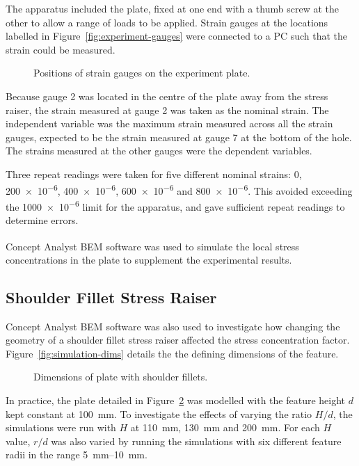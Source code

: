 \documentclass[a4paper,11pt,twocolumn]{article}
\newcommand{\BEM}{\textsc{BEM}\xspace}
\newcommand{\mm}{\si{\milli\meter}\xspace}
\begin{document}
The apparatus included the plate, fixed at one end with a thumb screw at the 
other to allow a range of loads to be applied. Strain gauges at the 
locations labelled in Figure~\vref{fig:experiment-gauges} were connected to a 
\textsc{PC} such that the strain could be measured.

\begin{figure}[h]
    \centering
    \def\svgwidth{0.48\textwidth}
    
    \caption{Positions of strain gauges on the experiment plate.}
    \label{fig:experiment-gauges}
\end{figure}

Because gauge 2 was located in the centre of the plate away from the
stress raiser, the strain measured at gauge 2 was taken as the nominal strain.
The independent variable was the maximum strain measured across all the strain
gauges, expected to be the strain measured at gauge 7 at the bottom of the
hole. The strains measured at the other gauges were the dependent variables.

Three repeat readings were taken for five different nominal strains: 0, 
\num{200e-6}, \num{400e-6}, \num{600e-6} and \num{800e-6}. This avoided
exceeding the \num{1000e-6} limit for the apparatus, and gave sufficient repeat
readings to determine errors.

Concept Analyst\textsuperscript{\textregistered} \BEM software was used to
simulate the local stress concentrations in the plate to supplement the
experimental results.

\subsection{Shoulder Fillet Stress Raiser}

Concept Analyst \BEM software was also used to investigate how changing the
geometry of a shoulder fillet stress raiser affected the stress concentration
factor. Figure~\vref{fig:simulation-dims} details the the defining dimensions of
the feature.

\begin{figure}[h]
    \centering
    \def\svgwidth{0.48\textwidth}
    
    \caption{Dimensions of plate with shoulder fillets.}
    \label{fig:simulation-dims}
\end{figure}

In practice, the plate detailed in Figure~\ref{fig:simulation-dims} was modelled
with the feature height $d$ kept constant at 100~\mm. To investigate the effects
of varying the ratio $H/d$, the simulations were run with $H$ at 110~\mm,
130~\mm and 200~\mm. For each $H$ value, $r/d$ was also varied by running the
simulations with six different feature radii in the range 5~\mm--10~\mm.
\end{document}
